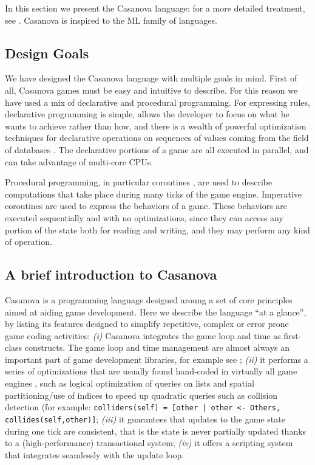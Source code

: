 
In this section we present the Casanova language; for a more detailed treatment, see \cite{CASANOVA_TR}. Casanova is inspired to the ML family of languages.

\subsection{Design Goals}
We have designed the Casanova language with multiple goals in mind. First of all, Casanova games must be easy and intuitive to describe. For this reason we have used a mix of declarative and procedural programming. For expressing rules, declarative programming is simple, allows the developer to focus on what he wants to achieve rather than how, and there is a wealth of powerful optimization techniques for declarative operations on sequences of values coming from the field of databases \cite{QUERY_OPT}. The declarative portions of a game are all executed in parallel, and can take advantage of multi-core CPUs.

Procedural programming, in particular coroutines \cite{COROUTINES}, are used to describe computations that take place during many ticks of the game engine. Imperative coroutines are used to express the behaviors of a game. These behaviors are executed sequentially and with no optimizations, since they can access any portion of the state both for reading and writing, and they may perform any kind of operation.


\subsection{A brief introduction to Casanova}
Casanova is a programming language designed aroung a set of core principles aimed at aiding game development. Here we describe the language ``at a glance'', by listing its features designed to simplify repetitive, complex or error prone game coding activities: \textit{(i)} Casanova integrates the game loop and time as first-class constructs. The game loop and time management are almost always an important part of game development libraries, for example see \cite{XNA}; \textit{(ii)} it performs a series of optimizations that are usually found hand-coded in virtually all game engines \cite{GAME_OPT}, such as logical optimization of queries on lists and spatial partitioning/use of indices to speed up quadratic queries such as collision detection (for example: \texttt{colliders(self) = [other | other <- Others, collides(self,other)]}; \textit{(iii)} it guarantees that updates to the game state during one tick are consistent, that is the state is never partially updated thanks to a (high-performance) transactional system; \textit{(iv)} it offers a scripting system that integrates seamlessly with the update loop.

